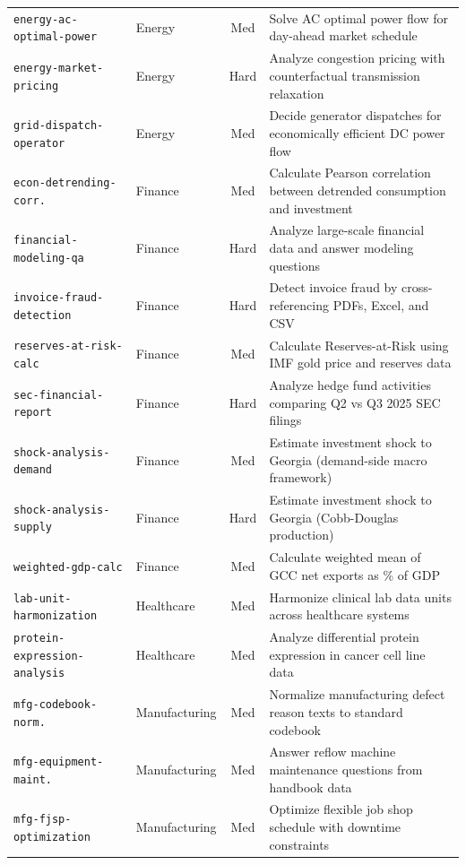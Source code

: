 \begin{longtable}{p{4.5cm}p{2.5cm}cp{7.5cm}}
\texttt{energy-ac-optimal-power} & Energy & Med & Solve AC optimal power flow for day-ahead market schedule \\
\texttt{energy-market-pricing} & Energy & Hard & Analyze congestion pricing with counterfactual transmission relaxation \\
\texttt{grid-dispatch-operator} & Energy & Med & Decide generator dispatches for economically efficient DC power flow \\
\midrule

\texttt{econ-detrending-corr.} & Finance & Med & Calculate Pearson correlation between detrended consumption and investment \\
\texttt{financial-modeling-qa} & Finance & Hard & Analyze large-scale financial data and answer modeling questions \\
\texttt{invoice-fraud-detection} & Finance & Hard & Detect invoice fraud by cross-referencing PDFs, Excel, and CSV \\
\texttt{reserves-at-risk-calc} & Finance & Med & Calculate Reserves-at-Risk using IMF gold price and reserves data \\
\texttt{sec-financial-report} & Finance & Hard & Analyze hedge fund activities comparing Q2 vs Q3 2025 SEC filings \\
\texttt{shock-analysis-demand} & Finance & Med & Estimate investment shock to Georgia (demand-side macro framework) \\
\texttt{shock-analysis-supply} & Finance & Hard & Estimate investment shock to Georgia (Cobb-Douglas production) \\
\texttt{weighted-gdp-calc} & Finance & Med & Calculate weighted mean of GCC net exports as \% of GDP \\
\midrule

\texttt{lab-unit-harmonization} & Healthcare & Med & Harmonize clinical lab data units across healthcare systems \\
\texttt{protein-expression-analysis} & Healthcare & Med & Analyze differential protein expression in cancer cell line data \\
\midrule

\texttt{mfg-codebook-norm.} & Manufacturing & Med & Normalize manufacturing defect reason texts to standard codebook \\
\texttt{mfg-equipment-maint.} & Manufacturing & Med & Answer reflow machine maintenance questions from handbook data \\
\texttt{mfg-fjsp-optimization} & Manufacturing & Med & Optimize flexible job shop schedule with downtime constraints \\
\midrule


\end{longtable}
